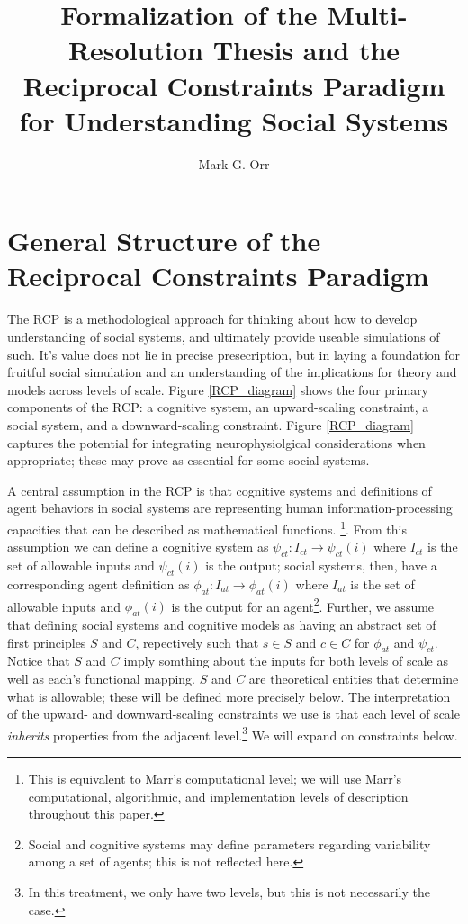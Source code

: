 \documentclass{article}
\title{Formalization of the Multi-Resolution Thesis and the Reciprocal Constraints Paradigm for Understanding Social Systems}
\author{Mark G. Orr}
\begin{document}
\maketitle
\section{General Structure of the Reciprocal Constraints Paradigm}
The RCP is a methodological approach for thinking about how to develop understanding of social systems, and ultimately provide useable simulations of such.  It's value does not lie in precise presecription, but in laying a foundation for fruitful social simulation and an understanding of the implications for theory and models across levels of scale.  Figure \ref{RCP_diagram} shows the four primary components of the RCP: a cognitive system, an upward-scaling constraint, a social system, and a downward-scaling constraint.  Figure \ref{RCP_diagram} captures the potential for integrating neurophysiolgical considerations when appropriate; these may prove as essential for some social systems.

A central assumption in the RCP is that cognitive systems and definitions of agent behaviors in social systems are representing human information-processing capacities that can be described as mathematical functions. \cite{van Rooij, 2008}\footnote{This is equivalent to Marr's computational level; we will use Marr's computational, algorithmic, and implementation levels of description\cite{Marr,1981} throughout this paper.}. From this assumption we can define a cognitive system as $\psi_{ct}: I_{ct} \rightarrow \psi_{ct}(i)$ where $I_{ct}$ is the set of allowable inputs and $\psi_{ct}(i)$ is the output; social systems, then, have a corresponding agent definition as $\phi_{at}: I_{at} \rightarrow \phi_{at}(i)$ where $I_{at}$ is the set of allowable inputs and $\phi_{at}(i)$ is the output for an agent\footnote{Social and cognitive systems may define parameters regarding variability among a set of agents; this is not reflected here.}.   Further, we assume that defining social systems and cognitive models as having an abstract set of first principles $S$ and $C$, repectively such that $s \in S$ and $c \in C$ for $\phi_{at}$ and $\psi_{ct}$. Notice that $S$ and $C$ imply somthing about the inputs for both levels of scale as well as each's functional mapping.  $S$ and $C$ are theoretical entities that determine what is allowable; these will be defined more precisely below. The interpretation of the upward- and downward-scaling constraints we use is that each level of scale \textit{inherits} properties from the adjacent level.\footnote{In this treatment, we only have two levels, but this is not necessarily the case.}  We will expand on constraints below. 
\end{document}
